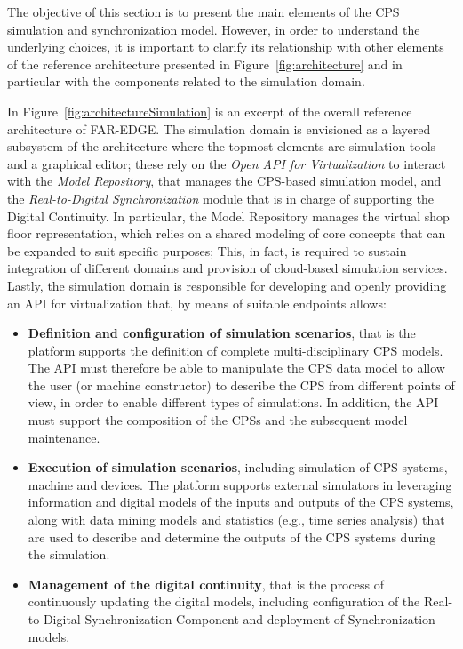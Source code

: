 The objective of this section is to present the main elements of the CPS simulation and synchronization model. However, in order to understand the underlying choices, it is important to clarify its relationship with other elements of the reference architecture presented in Figure~\ref{fig:architecture} and in particular with the components related to the simulation domain. 

In Figure~\ref{fig:architectureSimulation} is an excerpt of the overall reference architecture of FAR-EDGE. 
The simulation domain is envisioned as a layered subsystem of the architecture where the topmost elements are simulation tools and a graphical editor; these rely on the \textit{Open API for Virtualization} to interact with the \textit{Model Repository}, that manages the CPS-based simulation model, and the \textit{Real-to-Digital Synchronization} module that is in charge of supporting the Digital Continuity. 
In particular, the Model Repository manages the virtual shop floor representation, which relies on a shared modeling of core concepts that can be expanded to suit specific purposes; This, in fact, is required to sustain integration of different domains and provision of cloud-based simulation services. 
Lastly, the simulation domain is responsible for developing and openly providing an API for virtualization that, by means of suitable endpoints allows: 
\begin{itemize}
    \item \textbf{Definition and configuration of simulation scenarios}, that is the platform supports the definition of complete multi-disciplinary CPS models. The API must therefore be able to manipulate the CPS data model to allow the user (or machine constructor) to describe the CPS from different points of view, in order to enable different types of simulations. In addition, the API must support the composition of the CPSs and the subsequent model maintenance.  
    \item \textbf{Execution of simulation scenarios}, including simulation of CPS systems, machine and devices. The platform supports external simulators in leveraging information and digital models of the inputs and outputs of the CPS systems, along with data mining models and statistics (e.g., time series analysis) that are used to describe and determine the outputs of the CPS systems during the simulation.
    \item \textbf{Management of the digital continuity}, that is the process of continuously updating the digital models, including configuration of the Real-to-Digital Synchronization Component and deployment of Synchronization models. 
\end{itemize}



